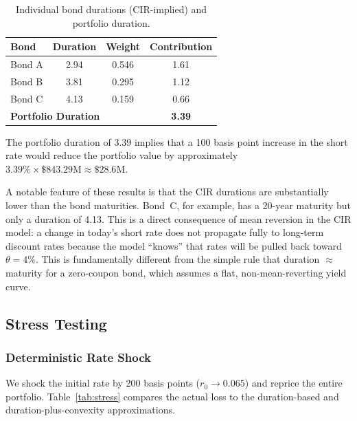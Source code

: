 \documentclass[12pt, a4paper]{article}
\begin{document}
\begin{table}[H]
\centering
\caption{Individual bond durations (CIR-implied) and portfolio duration.}
\label{tab:duration}
\begin{tabular}{lccc}
\toprule
Bond & Duration & Weight & Contribution \\
\midrule
Bond A & 2.94 & 0.546 & 1.61 \\
Bond B & 3.81 & 0.295 & 1.12 \\
Bond C & 4.13 & 0.159 & 0.66 \\
\midrule
\multicolumn{3}{l}{\textbf{Portfolio Duration}} & \textbf{3.39} \\
\bottomrule
\end{tabular}
\end{table}

The portfolio duration of 3.39 implies that a 100 basis point increase in the short rate would reduce the portfolio value by approximately $3.39\% \times \$843.29\text{M} \approx \$28.6\text{M}$.

A notable feature of these results is that the CIR durations are substantially lower than the bond maturities. Bond~C, for example, has a 20-year maturity but only a duration of 4.13. This is a direct consequence of mean reversion in the CIR model: a change in today's short rate does not propagate fully to long-term discount rates because the model ``knows'' that rates will be pulled back toward $\theta = 4\%$. This is fundamentally different from the simple rule that duration $\approx$ maturity for a zero-coupon bond, which assumes a flat, non-mean-reverting yield curve.


\subsection{Stress Testing}
\label{sec:stress}

\subsubsection{Deterministic Rate Shock}
\label{sec:stress_deterministic}

We shock the initial rate by 200 basis points ($r_0 \to 0.065$) and reprice the entire portfolio. Table~\ref{tab:stress} compares the actual loss to the duration-based and duration-plus-convexity approximations.
\end{document}

